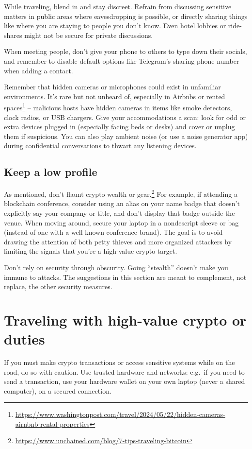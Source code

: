While traveling, blend in and stay discreet. Refrain from
discussing sensitive matters in public areas where
eavesdropping is possible, or directly sharing things like
where you are staying to people you don't know. Even hotel
lobbies or ride-shares might not be secure for private
discussions.

When meeting people, don't give your phone to others to
type down their socials, and remember to disable default
options like Telegram's sharing phone number when adding a
contact.

Remember that hidden cameras or microphones could exist in
unfamiliar environments. It's rare but not unheard of,
especially in Airbnbs or rented
spaces\footnote{\url{https://www.washingtonpost.com/travel/2024/05/22/hidden-cameras-airnbnb-rental-properties}}
-- malicious hosts have hidden cameras in items like smoke
detectors, clock radios, or USB chargers. Give your
accommodations a scan: look for odd or extra devices
plugged in (especially facing beds or desks) and cover or
unplug them if suspicious. You can also play ambient noise
(or use a noise generator app) during confidential
conversations to thwart any listening devices.

\subsection{Keep a low profile}

As mentioned, don't flaunt crypto wealth or
gear.\footnote{\url{https://www.unchained.com/blog/7-tips-traveling-bitcoin}}
For example, if attending a blockchain conference,
consider using an alias on your name badge that doesn't
explicitly say your company or title, and don't display
that badge outside the venue. When moving around, secure
your laptop in a nondescript sleeve or bag (instead of one
with a well-known conference brand). The goal is to avoid
drawing the attention of both petty thieves and more
organized attackers by limiting the signals that you're a
high-value crypto target.

Don't rely on security through obscurity. Going
``stealth'' doesn't make you immune to attacks. The
suggestions in this section are meant to complement, not
replace, the other security measures.

\section{Traveling with high-value crypto or duties}

If you must make crypto transactions or access sensitive
systems while on the road, do so with caution. Use trusted
hardware and networks: e.g.\ if you need to send a
transaction, use your hardware wallet on your own laptop
(never a shared computer), on a secured connection.

